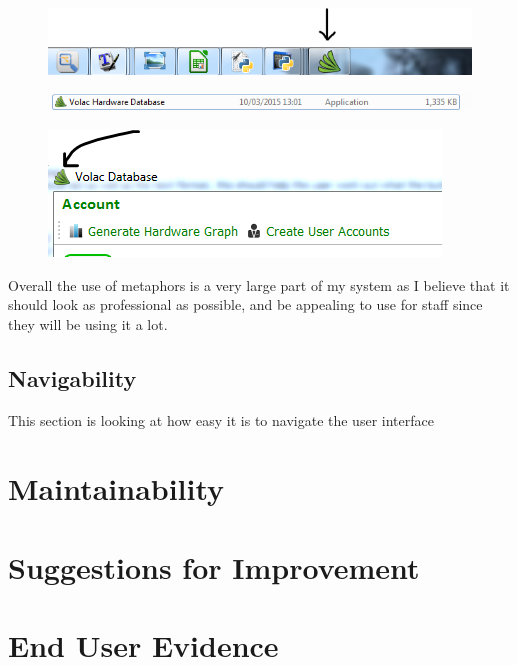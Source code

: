 \begin{figure}[H]
    \includegraphics[width=\textwidth]{./Evaluation/Images/volacicon.png}
\end{figure}

\begin{figure}[H]
    \includegraphics[width=\textwidth]{./Evaluation/Images/volacicon2.png}
\end{figure}

\begin{figure}[H]
    \includegraphics[width=\textwidth]{./Evaluation/Images/volacicon3.png}
\end{figure}

Overall the use of metaphors is a very large part of my system as I believe that it should look as professional as possible, and be appealing to use for staff since they will be using it a lot.

\subsection{Navigability}

This section is looking at how easy it is to navigate the user interface%

\section{Maintainability}

\section{Suggestions for Improvement}

\section{End User Evidence}
\newpage

